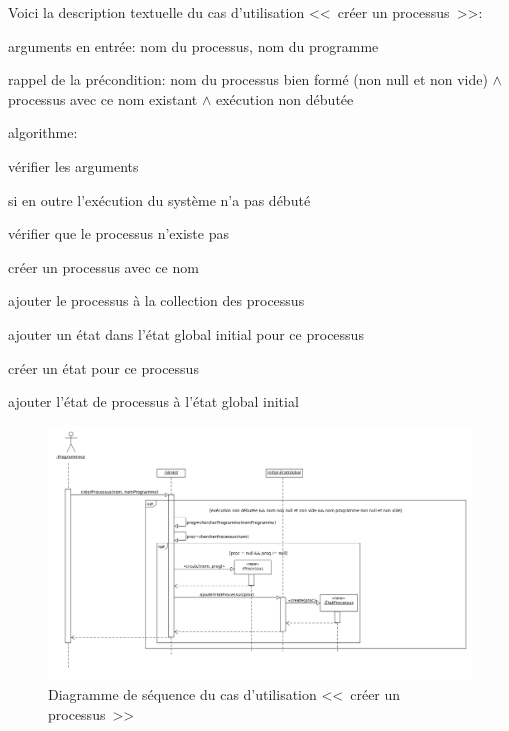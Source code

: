 \documentclass[11pt,article]{article}
\newcommand{\nullvalue}{\textsf{null}\xspace}
\begin{document}
Voici la description textuelle du cas d'utilisation <<~créer un processus~>>:
\begin{compactitem}
\item arguments en entrée: nom du processus, nom du programme
\item rappel de la précondition: nom du processus bien formé (non
  \nullvalue et non vide) $\land$ processus avec ce nom existant
  $\land$ exécution non débutée
\item algorithme:
  \begin{compactenum}
  \item vérifier les arguments
  \item si en outre l'exécution du système n'a pas débuté
    \begin{compactenum}
    \item vérifier que le processus n'existe pas
    \item créer un processus avec ce nom
    \item ajouter le processus à la collection des processus
    \item ajouter un état dans l'état global initial pour ce processus
    \begin{compactenum}
    \item créer un état pour ce processus
    \item ajouter l'état de processus à l'état global initial
    \end{compactenum}
    \end{compactenum}
  \end{compactenum}
\end{compactitem}

\begin{figure}[ht!]
\begin{center}
\includegraphics[scale=0.48]{DiagrammesDeSequence/simint_uml_diag_sequence_creer_processus}
\caption{Diagramme de séquence du cas d'utilisation <<~créer un processus~>>}
\end{center}
\label{umlet_diag_sequence_creer_processus}
\end{figure}
\end{document}
